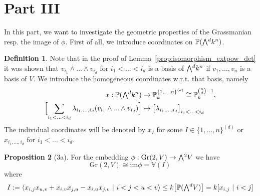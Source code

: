 \documentclass{scrartcl}
\newcommand{\V}{\mathbb{V}}
\newcommand{\Proj}{\mathbb{P}}
\newcommand{\Gr}{\mathrm{Gr}}
\newcommand{\extpow}{\mathchoice{{\textstyle\bigwedge}}
    {{\bigwedge}}
    {{\textstyle\wedge}}
    {{\scriptstyle\wedge}}}
\theoremstyle{definition}
\newtheorem{definition}{Definition}
\newtheorem{proposition}[definition]{Proposition}
\begin{document}
\section{Part III}
In this part, we want to investigate the geometric properties of the Grassmanian resp. the image of $\phi$.
First of all, we introduce coordinates on $\Proj(\extpow^d k^n)$.
\begin{definition}
    Note that in the proof of Lemma~\ref{prop:isomorphism_extpow_det} it was shown that $v_{i_1} \wedge ... \wedge v_{i_d}$ for $i_1 < ... < i_d$ is a basis of $\extpow^d k^n$ if $v_1, ..., v_n$ is a basis of $V$.
    We introduce the homogeneous coordinates w.r.t. that basis, namely
    \begin{align*}
        x: \Proj(\extpow^d k^n) &\to \Proj_k^{\{1, ..., n\}^{(d)}} \cong \Proj_k^{{n \choose d} - 1}, \\
        \Bigl[ \sum_{i_1 < ... < i_d} \lambda_{i_1, ..., i_d} (v_{i_1} \wedge ... \wedge v_{i_d}) \Bigr] &\mapsto \bigl[ \lambda_{i_1, ..., i_d} \bigr]_{i_1 < ... < i_d}
    \end{align*}
    The individual coordinates will be denoted by $x_I$ for some $I \in \{1, ..., n\}^{(d)}$ or $x_{i_1, ..., i_d}$ for $i_1 < ... < i_d$.
\end{definition}
\begin{proposition}[3a]
    \label{prop:equations_grassmanian_2}
    For the embedding $\phi: \Gr(2, V) \to \extpow^2 V$ we have
    \begin{equation*}
        \Gr(2, V) \cong \mathrm{im}\phi = \V(I)
    \end{equation*}
    where
    \begin{equation*}
        I := \langle x_{i, j}x_{u, v} + x_{i, v}x_{j, u} - x_{i, u}x_{j, v} \ | \ i < j < u < v \rangle \leq k\bigl[\Proj(\extpow^d V)\bigr] = k[x_{i, j} \ | \ i < j]
    \end{equation*}
\end{proposition}
\end{document}
